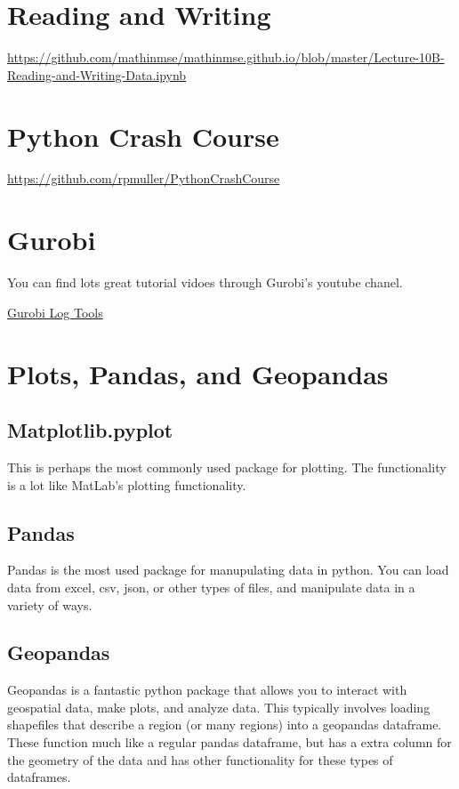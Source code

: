 \section{Reading and Writing}
\url{https://github.com/mathinmse/mathinmse.github.io/blob/master/Lecture-10B-Reading-and-Writing-Data.ipynb}

\section{Python Crash Course}
\url{https://github.com/rpmuller/PythonCrashCourse}


\section{Gurobi}
You can find lots great tutorial vidoes through Gurobi's youtube chanel.  

\href{https://github.com/Gurobi/grblogtools}{Gurobi Log Tools}


\section{Plots, Pandas, and Geopandas}
\todoSection{}
\subsection{Matplotlib.pyplot}
This is perhaps the most commonly used package for plotting.   The functionality is a lot like MatLab's plotting functionality.



\subsection{Pandas}
Pandas is the most used package for manupulating data in python.   You can load data from excel, csv, json, or other types of files, and manipulate data in a variety of ways.

\subsection{Geopandas}
Geopandas is a fantastic python package that allows you to interact with geospatial data, make plots, and analyze data.   This typically involves loading shapefiles that describe a region (or many regions) into a geopandas dataframe.  These function much like a regular pandas dataframe, but has a extra column for the geometry of the data and has other functionality for these types of dataframes.  

